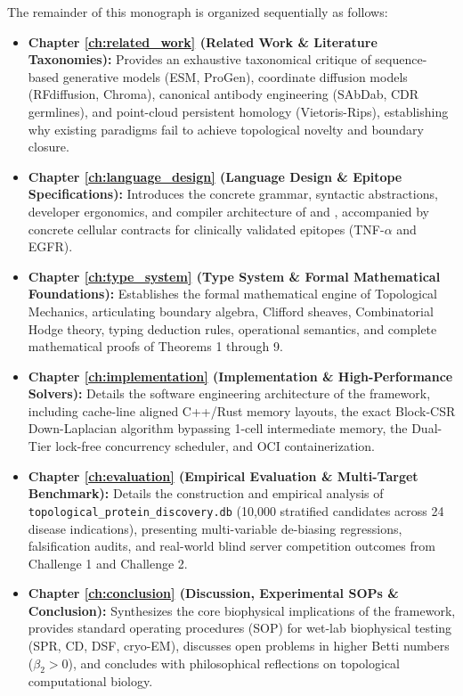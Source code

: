 The remainder of this monograph is organized sequentially as follows:
\begin{itemize}[leftmargin=1.5cm]
    \item \textbf{Chapter \ref{ch:related_work} (Related Work \& Literature Taxonomies):} Provides an exhaustive taxonomical critique of sequence-based generative models (ESM, ProGen), coordinate diffusion models (RFdiffusion, Chroma), canonical antibody engineering (SAbDab, CDR germlines), and point-cloud persistent homology (Vietoris-Rips), establishing why existing paradigms fail to achieve topological novelty and boundary closure.
    \item \textbf{Chapter \ref{ch:language_design} (Language Design \& Epitope Specifications):} Introduces the concrete grammar, syntactic abstractions, developer ergonomics, and compiler architecture of \ToposLang{} and \PLQ{}, accompanied by concrete cellular contracts for clinically validated epitopes (TNF-$\alpha$ and EGFR).
    \item \textbf{Chapter \ref{ch:type_system} (Type System \& Formal Mathematical Foundations):} Establishes the formal mathematical engine of Topological Mechanics, articulating boundary algebra, Clifford sheaves, Combinatorial Hodge theory, typing deduction rules, operational semantics, and complete mathematical proofs of Theorems 1 through 9.
    \item \textbf{Chapter \ref{ch:implementation} (Implementation \& High-Performance Solvers):} Details the software engineering architecture of the framework, including cache-line aligned C++/Rust memory layouts, the exact Block-CSR Down-Laplacian algorithm bypassing 1-cell intermediate memory, the Dual-Tier lock-free concurrency scheduler, and OCI containerization.
    \item \textbf{Chapter \ref{ch:evaluation} (Empirical Evaluation \& Multi-Target Benchmark):} Details the construction and empirical analysis of \texttt{topological\_protein\_discovery.db} (10,000 stratified candidates across 24 disease indications), presenting multi-variable de-biasing regressions, falsification audits, and real-world blind server competition outcomes from Challenge 1 and Challenge 2.
    \item \textbf{Chapter \ref{ch:conclusion} (Discussion, Experimental SOPs \& Conclusion):} Synthesizes the core biophysical implications of the framework, provides standard operating procedures (SOP) for wet-lab biophysical testing (SPR, CD, DSF, cryo-EM), discusses open problems in higher Betti numbers ($\beta_2 > 0$), and concludes with philosophical reflections on topological computational biology.
\end{itemize}
